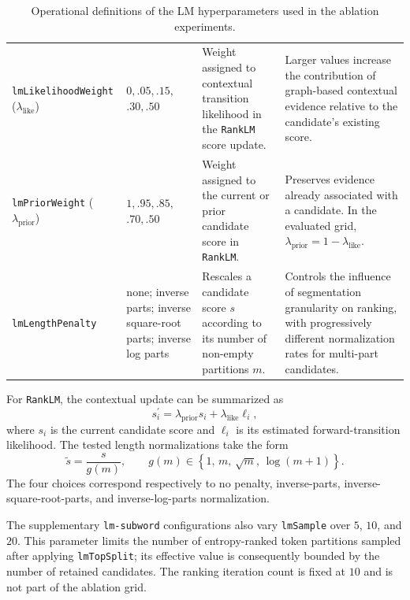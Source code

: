 \begin{table}[t]
\begin{tabular}{
    p{}
    p{}
    p{}
    p{}
  }
    \texttt{lmLikelihoodWeight} ($\lambda_{\mathrm{like}}$)
    & $0,.05,.15,$\newline $.30,.50$
    & Weight assigned to contextual transition likelihood in the
      \texttt{RankLM} score update.
    & Larger values increase the contribution of graph-based contextual
      evidence relative to the candidate's existing score.
      \\

    \texttt{lmPriorWeight} ($\lambda_{\mathrm{prior}}$)
    & $1,.95,.85,$\newline $.70,.50$
    & Weight assigned to the current or prior candidate score in
      \texttt{RankLM}.
    & Preserves evidence already associated with a candidate. In the
      evaluated grid,
      $\lambda_{\mathrm{prior}}=1-\lambda_{\mathrm{like}}$.
      \\

    \texttt{lmLengthPenalty}
    & none; inverse parts; inverse square-root parts; inverse log parts
    & Rescales a candidate score $s$ according to its number of non-empty
      partitions $m$.
    & Controls the influence of segmentation granularity on ranking, with
      progressively different normalization rates for multi-part candidates.
      \\
    \hline
  \end{tabular}
  \caption{Operational definitions of the LM hyperparameters used in the
  ablation experiments.}
  \label{tab:hyperparameters}
\end{table}

For \texttt{RankLM}, the contextual update can be summarized as
\begin{equation}
  s_i^{\prime}
  =
  \lambda_{\mathrm{prior}}s_i
  +
  \lambda_{\mathrm{like}}\ell_i,
\end{equation}
where $s_i$ is the current candidate score and $\ell_i$ is its estimated
forward-transition likelihood. The tested length normalizations take the
form
\begin{equation}
  \widetilde{s}
  =
  \frac{s}{g(m)},
  \qquad
  g(m)\in
  \left\{
    1,\,
    m,\,
    \sqrt{m},\,
    \log(m+1)
  \right\}.
\end{equation}
The four choices correspond respectively to no penalty, inverse-parts,
inverse-square-root-parts, and inverse-log-parts normalization.

The supplementary \texttt{lm-subword} configurations also vary
\texttt{lmSample} over $5$, $10$, and $20$. This parameter limits the number
of entropy-ranked token partitions sampled after applying
\texttt{lmTopSplit}; its effective value is consequently bounded by the
number of retained candidates. The ranking iteration count is fixed at $10$
and is not part of the ablation grid.

